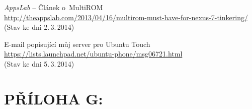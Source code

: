 \documentclass[12pt, a4paper, oneside]{article}
\newcommand{\It}{\textit}  %
\begin{document}
\begin{thebibliography}{99}
     \It{AppsLab} -- Článek o~MultiROM\\
    \url{http://theappslab.com/2013/04/16/multirom-must-have-for-nexus-7-tinkering/}\\
    (Stav ke dni 2.\,3.\,2014)

     E-mail popisující můj server pro Ubuntu Touch\\
    \url{https://lists.launchpad.net/ubuntu-phone/msg06721.html}\\
    (Stav ke dni 5.\,3.\,2014)

\end{thebibliography}

\newpage
\section*{PŘÍLOHA G:}
~
\listoffigures   %
\end{document}

